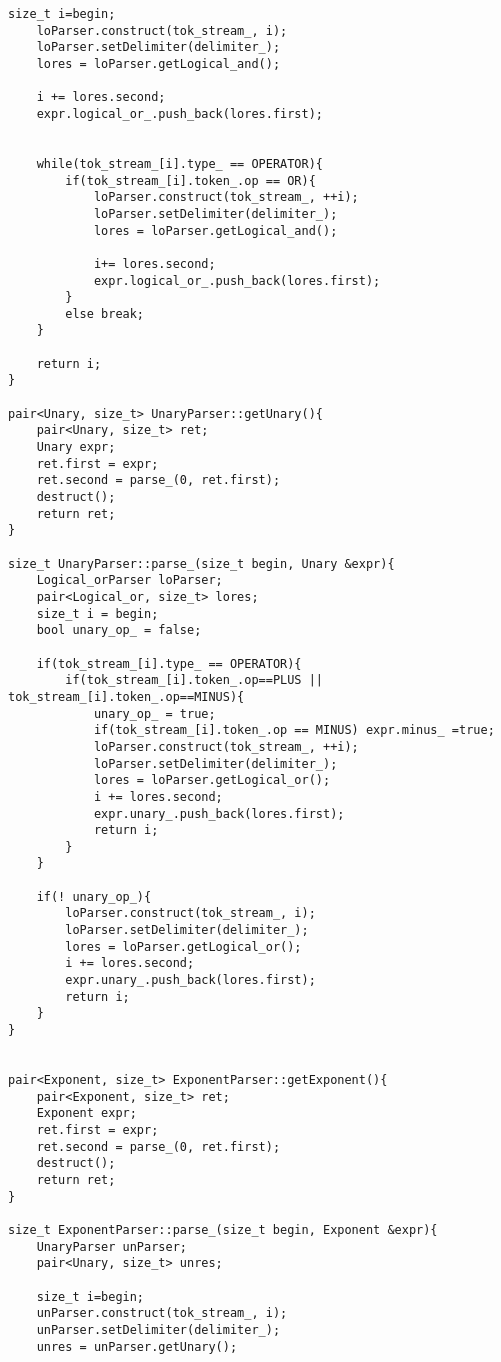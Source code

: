 \documentclass[pdftex,12pt,letterpaper,notitlepage,twoside]{article}
\begin{document}
\begin{lstlisting}[frame=single,caption={C program for testing}]
    size_t i=begin;
    loParser.construct(tok_stream_, i);
    loParser.setDelimiter(delimiter_);
    lores = loParser.getLogical_and();

    i += lores.second;
    expr.logical_or_.push_back(lores.first);
    

    while(tok_stream_[i].type_ == OPERATOR){
        if(tok_stream_[i].token_.op == OR){
            loParser.construct(tok_stream_, ++i);
            loParser.setDelimiter(delimiter_);
            lores = loParser.getLogical_and();
            
            i+= lores.second;
            expr.logical_or_.push_back(lores.first);
        }
        else break;
    }

    return i;
}

pair<Unary, size_t> UnaryParser::getUnary(){
    pair<Unary, size_t> ret;
    Unary expr;
    ret.first = expr;
    ret.second = parse_(0, ret.first);
    destruct();
    return ret;
}

size_t UnaryParser::parse_(size_t begin, Unary &expr){
    Logical_orParser loParser;
    pair<Logical_or, size_t> lores;
    size_t i = begin;
    bool unary_op_ = false;

    if(tok_stream_[i].type_ == OPERATOR){
        if(tok_stream_[i].token_.op==PLUS || tok_stream_[i].token_.op==MINUS){
            unary_op_ = true;
            if(tok_stream_[i].token_.op == MINUS) expr.minus_ =true;
            loParser.construct(tok_stream_, ++i);
            loParser.setDelimiter(delimiter_);
            lores = loParser.getLogical_or();
            i += lores.second;
            expr.unary_.push_back(lores.first);
            return i;
        }
    }

    if(! unary_op_){
        loParser.construct(tok_stream_, i);
        loParser.setDelimiter(delimiter_);
        lores = loParser.getLogical_or();
        i += lores.second;
        expr.unary_.push_back(lores.first);
        return i;
    }
}


pair<Exponent, size_t> ExponentParser::getExponent(){
    pair<Exponent, size_t> ret;
    Exponent expr;
    ret.first = expr;
    ret.second = parse_(0, ret.first);
    destruct();
    return ret;
}

size_t ExponentParser::parse_(size_t begin, Exponent &expr){
    UnaryParser unParser;
    pair<Unary, size_t> unres;

    size_t i=begin;
    unParser.construct(tok_stream_, i);
    unParser.setDelimiter(delimiter_);
    unres = unParser.getUnary();


\end{lstlisting}
\end{document}
